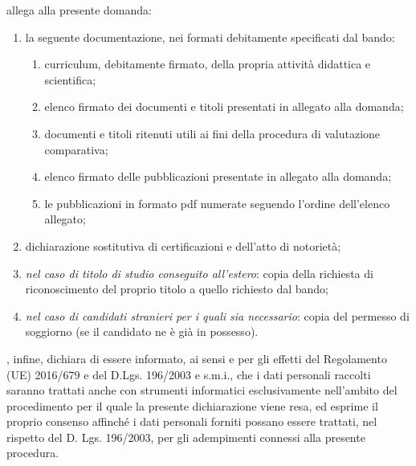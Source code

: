 
\myTextField[.5cm]{}  allega alla presente 
domanda:
\begin{enumerate}
\item la seguente documentazione, nei formati debitamente specificati dal bando:
\begin{enumerate}[label=\emph{\roman*})]
\item curriculum, debitamente firmato, della propria attività didattica e scientifica;
\item elenco firmato dei documenti e titoli presentati in allegato alla domanda;
\item documenti e titoli ritenuti utili ai fini della procedura di valutazione 
comparativa;
\item elenco firmato delle pubblicazioni presentate in allegato alla domanda;
\item le pubblicazioni in formato pdf numerate seguendo l’ordine dell’elenco 
allegato;
\end{enumerate}
\item 	dichiarazione sostitutiva di certificazioni e dell’atto di notorietà;
\item  \emph{nel caso di titolo di studio conseguito all’estero}: copia della richiesta di riconoscimento del proprio titolo a quello richiesto dal bando;
\item \emph{nel caso di candidati stranieri per i quali sia necessario}: copia del permesso di soggiorno (se il candidato ne è già in possesso).
\end{enumerate}
\myTextField[.5cm]{} , infine, dichiara di essere informato, ai sensi e per gli effetti del Regolamento (UE) 2016/679 e del D.Lgs. 196/2003 e s.m.i., che i dati personali raccolti saranno trattati anche con strumenti informatici esclusivamente nell’ambito del procedimento per il quale la presente dichiarazione viene resa, ed esprime il proprio 
consenso affinché i dati personali forniti possano essere trattati, nel rispetto del D. Lgs. 196/2003, per gli adempimenti connessi alla presente procedura.

